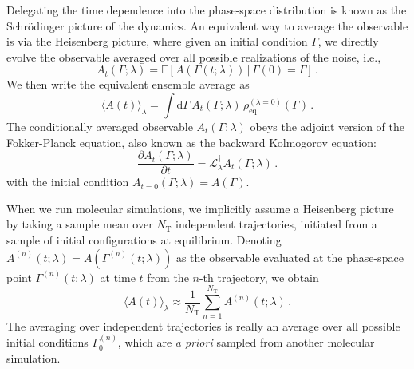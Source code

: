 Delegating the time dependence into the phase-space distribution is known as the Schr\"odinger picture of the dynamics.\cite{tuckerman2010statistical} An equivalent way to average the observable is via the Heisenberg picture, where given an initial condition $\Gamma$, we directly evolve the observable averaged over all possible realizations of the noise, i.e., 
\begin{equation}
A_{t}(\Gamma; \lambda) = \mathbb{E}\left[ A(\Gamma(t; \lambda)) \, | \, \Gamma(0)=\Gamma \right] \,.
\end{equation}
We then write the equivalent ensemble average as
\begin{equation}
\langle A(t) \rangle_\lambda = \int \mathrm{d}\Gamma \, A_{t}(\Gamma; \lambda) \,
\rho^{(\lambda=0)}_\mathrm{eq}(\Gamma) \,.
\end{equation}
The conditionally averaged observable $A_{t}(\Gamma; \lambda)$ obeys the adjoint version of the Fokker-Planck equation, also known as the backward Kolmogorov equation:\cite{risken1996fokker,gardiner2009stochastic}
\begin{equation}
\frac{\partial A_{t}(\Gamma; \lambda)}{\partial t} = \mathcal{L}^\dagger_\lambda A_t(\Gamma; \lambda) \,.
\end{equation}
with the initial condition $A_{t=0}(\Gamma; \lambda) = A(\Gamma)$.

When we run molecular simulations, we implicitly assume a Heisenberg picture by taking a sample mean over $N_\mathrm{T}$ independent trajectories, initiated from a sample of initial configurations at equilibrium. Denoting $A^{(n)}(t;\lambda) = A(\Gamma^{(n)}(t;\lambda))$ as the observable evaluated at the phase-space point $\Gamma^{(n)}(t;\lambda)$ at time $t$ from the $n$-th trajectory, we obtain
\begin{equation}
\langle A(t) \rangle_\lambda \approx \frac{1}{N_\mathrm{T}} \sum_{n=1}^{N_\mathrm{T}} A^{(n)}(t;\lambda) \,.
\end{equation}
The averaging over independent trajectories is really an average over all possible initial conditions $\Gamma^{(n)}_0$, which are \textit{a priori} sampled from another molecular simulation.


